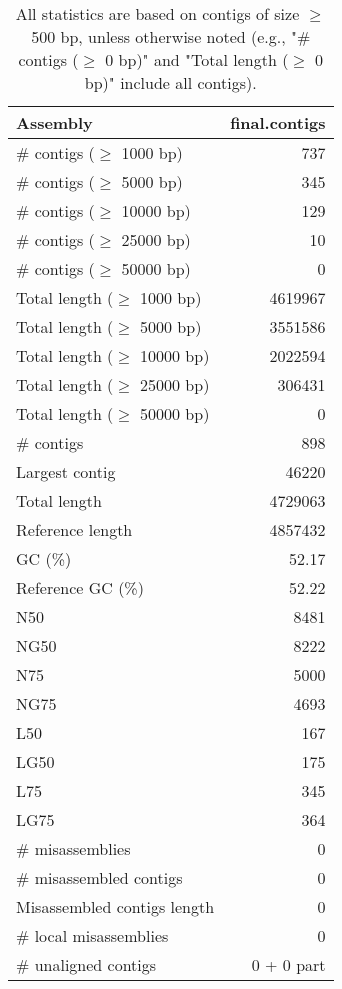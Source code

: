 \documentclass[12pt,a4paper]{article}
\begin{document}
\begin{table}[ht]
\begin{center}
\caption{All statistics are based on contigs of size $\geq$ 500 bp, unless otherwise noted (e.g., "\# contigs ($\geq$ 0 bp)" and "Total length ($\geq$ 0 bp)" include all contigs).}
\begin{tabular}{|l*{1}{|r}|}
\hline
Assembly & final.contigs \\ \hline
\# contigs ($\geq$ 1000 bp) & 737 \\ \hline
\# contigs ($\geq$ 5000 bp) & 345 \\ \hline
\# contigs ($\geq$ 10000 bp) & 129 \\ \hline
\# contigs ($\geq$ 25000 bp) & 10 \\ \hline
\# contigs ($\geq$ 50000 bp) & 0 \\ \hline
Total length ($\geq$ 1000 bp) & 4619967 \\ \hline
Total length ($\geq$ 5000 bp) & 3551586 \\ \hline
Total length ($\geq$ 10000 bp) & 2022594 \\ \hline
Total length ($\geq$ 25000 bp) & 306431 \\ \hline
Total length ($\geq$ 50000 bp) & 0 \\ \hline
\# contigs & 898 \\ \hline
Largest contig & 46220 \\ \hline
Total length & 4729063 \\ \hline
Reference length & 4857432 \\ \hline
GC (\%) & 52.17 \\ \hline
Reference GC (\%) & 52.22 \\ \hline
N50 & 8481 \\ \hline
NG50 & 8222 \\ \hline
N75 & 5000 \\ \hline
NG75 & 4693 \\ \hline
L50 & 167 \\ \hline
LG50 & 175 \\ \hline
L75 & 345 \\ \hline
LG75 & 364 \\ \hline
\# misassemblies & 0 \\ \hline
\# misassembled contigs & 0 \\ \hline
Misassembled contigs length & 0 \\ \hline
\# local misassemblies & 0 \\ \hline
\# unaligned contigs & 0 + 0 part \\ \hline

\end{tabular}
\end{center}
\end{table}
\end{document}
